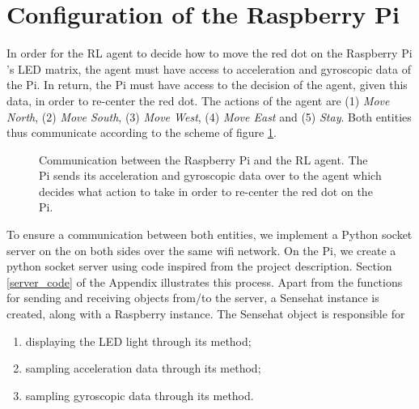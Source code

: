 \section{Configuration of the Raspberry Pi}

In order for the RL agent to decide how to move the red dot on the Raspberry Pi 's LED matrix, the agent must have access to acceleration and gyroscopic data of the Pi. In return, the Pi must have access to the decision of the agent, given this data, in order to re-center the red dot. The actions of the agent are (1) \textit{Move North}, (2) \textit{Move South}, (3) \textit{Move West}, (4) \textit{Move East} and (5) \textit{Stay}.  Both entities thus communicate according to the scheme of figure \ref{communication}.

\begin{figure}

\centering


\caption{Communication between the Raspberry Pi and the RL agent. The Pi sends its acceleration and gyroscopic data over to the agent which decides what action to take in order to re-center the red dot on the Pi.} 
\label{communication}
\end{figure}

To ensure a communication between both entities, we implement a Python socket server on the on both sides over the same wifi network. On the Pi, we create a python socket server using code inspired from the project description. Section \ref{server_code} of the Appendix illustrates this process. Apart from the functions for sending and receiving objects from/to the server, a Sensehat instance is created, along with a Raspberry instance. The Sensehat object is responsible for

\begin{enumerate}
\item displaying the LED light through its \texttt{} method;
\item sampling acceleration data through its  \texttt{} method;
\item sampling gyroscopic data through its  \texttt{} method.
\end{enumerate}

